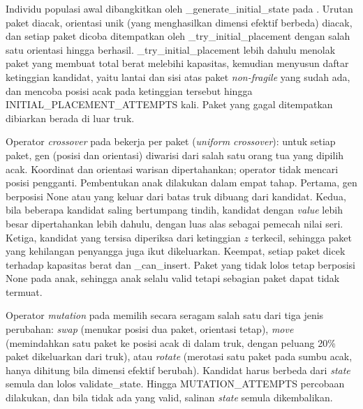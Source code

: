 Individu populasi awal dibangkitkan oleh \_generate\_initial\_state pada . Urutan paket diacak, orientasi unik (yang menghasilkan dimensi efektif berbeda) diacak, dan setiap paket dicoba ditempatkan oleh \_try\_initial\_placement dengan salah satu orientasi hingga berhasil. \_try\_initial\_placement lebih dahulu menolak paket yang membuat total berat melebihi kapasitas, kemudian menyusun daftar ketinggian kandidat, yaitu lantai dan sisi atas paket \textit{non-fragile} yang sudah ada, dan mencoba posisi acak pada ketinggian tersebut hingga INITIAL\_PLACEMENT\_ATTEMPTS kali. Paket yang gagal ditempatkan dibiarkan berada di luar truk.


Operator \textit{crossover} pada  bekerja per paket (\textit{uniform crossover}): untuk setiap paket, gen (posisi dan orientasi) diwarisi dari salah satu orang tua yang dipilih acak. Koordinat dan orientasi warisan dipertahankan; operator tidak mencari posisi pengganti. Pembentukan anak dilakukan dalam empat tahap. Pertama, gen berposisi None atau yang keluar dari batas truk dibuang dari kandidat. Kedua, bila beberapa kandidat saling bertumpang tindih, kandidat dengan \textit{value} lebih besar dipertahankan lebih dahulu, dengan luas alas sebagai pemecah nilai seri. Ketiga, kandidat yang tersisa diperiksa dari ketinggian $z$ terkecil, sehingga paket yang kehilangan penyangga juga ikut dikeluarkan. Keempat, setiap paket dicek terhadap kapasitas berat dan \_can\_insert. Paket yang tidak lolos tetap berposisi None pada anak, sehingga anak selalu valid tetapi sebagian paket dapat tidak termuat.


Operator \textit{mutation} pada  memilih secara seragam salah satu dari tiga jenis perubahan: \textit{swap} (menukar posisi dua paket, orientasi tetap), \textit{move} (memindahkan satu paket ke posisi acak di dalam truk, dengan peluang 20\% paket dikeluarkan dari truk), atau \textit{rotate} (merotasi satu paket pada sumbu acak, hanya dihitung bila dimensi efektif berubah). Kandidat harus berbeda dari \textit{state} semula dan lolos validate\_state. Hingga MUTATION\_ATTEMPTS percobaan dilakukan, dan bila tidak ada yang valid, salinan \textit{state} semula dikembalikan.

